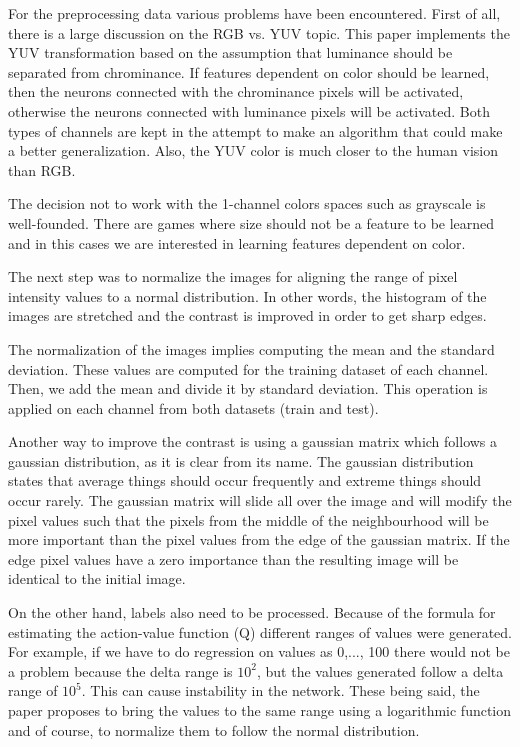 For the preprocessing data various problems have been encountered. First of all, there is a large discussion on the RGB vs. YUV topic. This paper implements the YUV transformation based on the assumption that luminance should be separated from chrominance. If features dependent on color should be learned, then the neurons connected with the chrominance pixels will be activated, otherwise the neurons connected with luminance pixels will be activated. Both types of channels are kept in the attempt to make an algorithm that could make a better generalization.  Also, the YUV color is much closer to the human vision than RGB. 

The decision not to work with the 1-channel colors spaces such as grayscale is well-founded. There are games where size should not be a feature to be learned and in this cases we are interested in learning features dependent on color.

The next step was to normalize the images for aligning the range of pixel intensity values to a normal distribution. In other words, the histogram of the images are stretched and the contrast is improved in order to get sharp edges.

The normalization of the images implies computing the mean and the standard deviation. These values are computed for the training dataset of each channel. Then, we add the mean and divide it by standard deviation. This operation is applied on each channel from both datasets (train and test).

Another way to improve the contrast is using a gaussian matrix which follows a gaussian distribution, as it is clear from its name. The gaussian distribution states that average things should occur frequently and extreme things should occur rarely. The gaussian matrix will slide all over the image and will modify the pixel values such that the pixels from the middle of the neighbourhood will be more important than the pixel values from the edge of the gaussian matrix. If the edge pixel values have a zero importance than the resulting image will be identical to the initial image.

On the other hand, labels also need to be processed. Because of the formula for estimating the action-value function (Q) different ranges of values were generated. For example, if we have to do regression on values as 0,..., 100 there would not be a problem because the delta range is $10^2$, but the values generated follow a delta range of $10^5$. This can cause instability in the network. These being said, the paper proposes to bring the values to the same range using a logarithmic function and of course, to normalize them to follow the normal distribution.

